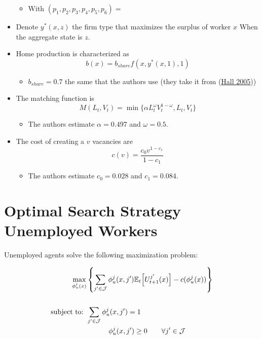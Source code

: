 \documentclass[
  letterpaper,
  DIV=11,
  numbers=noendperiod]{scrreprt}
\providecommand{\tightlist}{%
  \setlength{\itemsep}{0pt}\setlength{\parskip}{0pt}}\usepackage{longtable,booktabs,array}
\begin{document}
\begin{itemize}
  \begin{itemize}
  \tightlist
  \item
    With \((p_1, p_2, p_3, p_4, p_5, p_6) =\)
  \end{itemize}
\item
  Denote \(y^*(x,z)\) the firm type that maximizes the surplus of worker
  \(x\) When the aggregate state is \(z\).
\item
  Home production is characterized as
  \[b(x) = b_{share} f(x,y^*(x,1),1)\]

  \begin{itemize}
  \tightlist
  \item
    \(b_{share} = 0.7\) the same that the authors use (they take it from
    (\protect\hyperlink{ref-hallEmploymentFluctuationsEquilibrium2005}{Hall
    2005}))
  \end{itemize}
\item
  The matching function is
  \[M(L_t, V_t) = \min\{\alpha L_t^{\omega}V_t^{1-\omega}, L_t, V_t\}\]

  \begin{itemize}
  \tightlist
  \item
    The authors estimate \(\alpha = 0.497\) and \(\omega=0.5\).
  \end{itemize}
\item
  The cost of creating a \(v\) vacancies are
  \[c(v) = \frac{c_0 v^{1-c_1}}{1 - c_1}\]

  \begin{itemize}
  \tightlist
  \item
    The authors estimate \(c_0 = 0.028\) and \(c_1 = 0.084\).
  \end{itemize}
\end{itemize}

\cleardoublepage
{}
{}
\appendix

\hypertarget{sec-appendix_search_unemp}{%
\chapter{Optimal Search Strategy Unemployed
Workers}\label{sec-appendix_search_unemp}}

Unemployed agents solve the following maximization problem:

\begin{align*}
    \max_{\phi^j_u(x)}&\left\{ \sum_{j'\in\mathcal{J}}\phi^j_u(x, j')\mathbb{E}_t\Big[U^{j'}_{t+1}(x)  \Big] -c(\phi^j_u(x)) \right\} \\ \\
    \text{subject to: } & \sum_{j'\in \mathcal{J}}\phi^j_u(x, j') = 1 \\
    & \hspace{1.1 cm} \phi^j_u(x, j') \geq 0 \qquad \forall j'\in \mathcal{J}
\end{align*}
\end{document}
